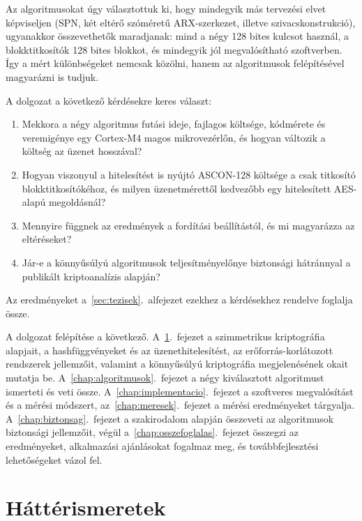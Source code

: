 \documentclass[a4paper,12pt]{report}
\theoremstyle{definition}
\theoremstyle{remark}
\begin{document}
Az algoritmusokat úgy választottuk ki, hogy mindegyik más tervezési elvet képviseljen (SPN, két eltérő szóméretű ARX-szerkezet, illetve szivacskonstrukció), ugyanakkor összevethetők maradjanak: mind a négy 128 bites kulcsot használ, a blokktitkosítók 128 bites blokkot, és mindegyik jól megvalósítható szoftverben. Így a mért különbségeket nemcsak közölni, hanem az algoritmusok felépítésével magyarázni is tudjuk.

A dolgozat a következő kérdésekre keres választ:
\begin{enumerate}
	\item[K1.] Mekkora a négy algoritmus futási ideje, fajlagos költsége, kódmérete és veremigénye egy Cortex-M4 magos mikrovezérlőn, és hogyan változik a költség az üzenet hosszával?
	\item[K2.] Hogyan viszonyul a hitelesítést is nyújtó ASCON-128 költsége a csak titkosító blokktitkosítókéhoz, és milyen üzenetmérettől kedvezőbb egy hitelesített AES-alapú megoldásnál?
	\item[K3.] Mennyire függnek az eredmények a fordítási beállítástól, és mi magyarázza az eltéréseket?
	\item[K4.] Jár-e a könnyűsúlyú algoritmusok teljesítményelőnye biztonsági hátránnyal a publikált kriptoanalízis alapján?
\end{enumerate}
Az eredményeket a~\ref{sec:tezisek}.~alfejezet ezekhez a kérdésekhez rendelve foglalja össze.

A dolgozat felépítése a következő. A~\ref{chap:hatter}.~fejezet a szimmetrikus kriptográfia alapjait, a hashfüggvényeket és az üzenethitelesítést, az erőforrás-korlátozott rendszerek jellemzőit, valamint a könnyűsúlyú kriptográfia megjelenésének okait mutatja be. A~\ref{chap:algoritmusok}.~fejezet a négy kiválasztott algoritmust ismerteti és veti össze. A~\ref{chap:implementacio}.~fejezet a szoftveres megvalósítást és a mérési módszert, az~\ref{chap:meresek}.~fejezet a mérési eredményeket tárgyalja. A~\ref{chap:biztonsag}.~fejezet a szakirodalom alapján összeveti az algoritmusok biztonsági jellemzőit, végül a~\ref{chap:osszefoglalas}.~fejezet összegzi az eredményeket, alkalmazási ajánlásokat fogalmaz meg, és továbbfejlesztési lehetőségeket vázol fel.

\chapter{Háttérismeretek}\label{chap:hatter}
\end{document}
